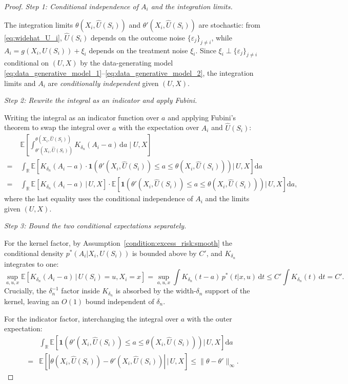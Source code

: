 \documentclass[12pt]{article}
\newcommand{\E}{\mathbb{E}}
\newcommand{\R}{\mathbb{R}}
\begin{document}
\begin{proof}
\noindent\textit{Step 1: Conditional independence of $A_i$ and the integration limits.}

The integration limits $\theta(X_i,\widehat{U}(S_i))$ and $\theta'(X_i,\widehat{U}(S_i))$ are stochastic: from \eqref{eq:widehat_U_i}, $\widehat{U}(S_i)$ depends on the outcome noise $\{\varepsilon_j\}_{j\neq i}$, while $A_i = g(X_i,U(S_i))+\xi_i$ depends on the treatment noise $\xi_i$.  Since $\xi_i\perp\{\varepsilon_j\}_{j\neq i}$ conditional on $(U,X)$ by the data-generating model \eqref{eq:data_generative_model_1}--\eqref{eq:data_generative_model_2}, the integration limits and $A_i$ are \emph{conditionally independent} given $(U,X)$.

\noindent\textit{Step 2: Rewrite the integral as an indicator and apply Fubini.}

Writing the integral as an indicator function over $a$ and applying Fubini's theorem to swap the integral over $a$ with the expectation over $A_i$ and $\widehat{U}(S_i)$:
\begin{align*}
&\E\!\left[\int_{\theta'(X_i,\widehat{U}(S_i))}^{\theta(X_i,\widehat{U}(S_i))}K_{\delta_n}(A_i-a)\,\mathrm{d}a\;\Bigg|\;U,X\right]\\
=\;&\int_{\R}\E\!\left[K_{\delta_n}(A_i-a)\cdot\mathbf{1}\!\left(\theta'(X_i,\widehat{U}(S_i))\leq a\leq\theta(X_i,\widehat{U}(S_i))\right)\Big|\,U,X\right]\mathrm{d}a\\
=\;&\int_{\R}\E\!\left[K_{\delta_n}(A_i-a)\,\big|\,U,X\right]\cdot\E\!\left[\mathbf{1}\!\left(\theta'(X_i,\widehat{U}(S_i))\leq a\leq\theta(X_i,\widehat{U}(S_i))\right)\Big|\,U,X\right]\mathrm{d}a,
\end{align*}
where the last equality uses the conditional independence of $A_i$ and the limits given $(U,X)$.

\noindent\textit{Step 3: Bound the two conditional expectations separately.}

For the kernel factor, by Assumption~\ref{condition:excess_risk:smooth} the conditional density $p^*(A_i|X_i,U(S_i))$ is bounded above by $C'$, and $K_{\delta_n}$ integrates to one:
$$\sup_{a,u,x}\E\!\left[K_{\delta_n}(A_i-a)\,\big|\,U(S_i)=u,X_i=x\right] = \sup_{a,u,x}\int K_{\delta_n}(t-a)\,p^*(t|x,u)\,\mathrm{d}t \leq C'\int K_{\delta_n}(t)\,\mathrm{d}t = C'.$$
Crucially, the $\delta_n^{-1}$ factor inside $K_{\delta_n}$ is absorbed by the width-$\delta_n$ support of the kernel, leaving an $O(1)$ bound independent of $\delta_n$.

For the indicator factor, interchanging the integral over $a$ with the outer expectation:
\begin{align*}
&\int_{\R}\E\!\left[\mathbf{1}\!\left(\theta'(X_i,\widehat{U}(S_i))
\leq a\leq\theta(X_i,\widehat{U}(S_i))\right)\Big|\,U,X\right]\mathrm{d}a\\
= &\E\!\left[|\theta(X_i,\widehat{U}(S_i))-\theta'(X_i,\widehat{U}(S_i))|\,\big|\,U,X\right]
\leq \|\theta-\theta'\|_\infty.
\end{align*}


\end{proof}
\end{document}
